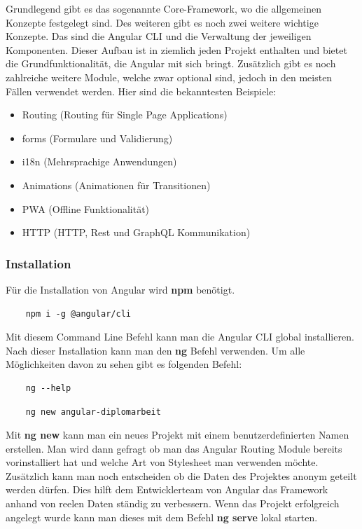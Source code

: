 Grundlegend gibt es das sogenannte Core-Framework, wo die allgemeinen Konzepte festgelegt sind. Des weiteren gibt es noch zwei weitere wichtige Konzepte. Das sind die Angular CLI und die Verwaltung der jeweiligen Komponenten. Dieser Aufbau ist in ziemlich jeden Projekt enthalten und bietet die Grundfunktionalität, die Angular mit sich bringt. Zusätzlich gibt es noch zahlreiche weitere Module, welche zwar optional sind, jedoch in den meisten Fällen verwendet werden. Hier sind die bekanntesten Beispiele:

\begin{itemize}
    \item Routing  (Routing für Single Page Applications)
    \item forms (Formulare und Validierung)
    \item i18n (Mehrsprachige Anwendungen)
    \item Animations (Animationen für Transitionen)
    \item PWA  (Offline Funktionalität)
    \item HTTP (HTTP, Rest und GraphQL Kommunikation)
\end{itemize}

\subsubsection{Installation}
Für die Installation von Angular wird \textbf{npm} benötigt.

\begin{lstlisting}
    npm i -g @angular/cli
\end{lstlisting}

Mit diesem Command Line Befehl kann man die Angular CLI global installieren. Nach dieser Installation kann man den \textbf{ng} Befehl verwenden. Um alle Möglichkeiten davon zu sehen gibt es folgenden Befehl:

\begin{lstlisting}
    ng --help
\end{lstlisting}
\newline
\begin{lstlisting}
    ng new angular-diplomarbeit
\end{lstlisting}

Mit \textbf{ng new} kann man ein neues Projekt mit einem benutzerdefinierten Namen erstellen. Man wird dann gefragt ob man das Angular Routing Module bereits vorinstalliert hat und welche Art von Stylesheet man verwenden möchte. Zusätzlich kann man noch entscheiden ob die Daten des Projektes anonym geteilt werden dürfen. Dies hilft dem Entwicklerteam von Angular das Framework anhand von reelen Daten ständig zu verbessern. Wenn das Projekt erfolgreich angelegt wurde kann man dieses mit dem Befehl \textbf{ng serve} lokal starten.

